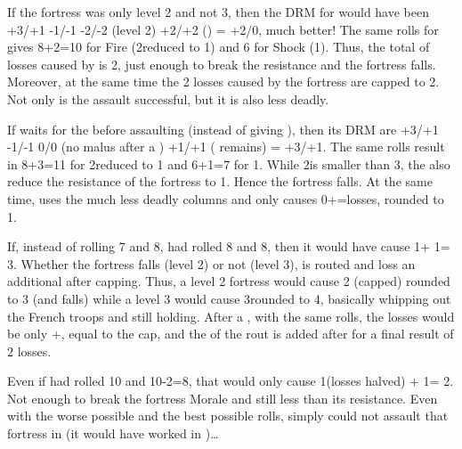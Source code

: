 \begin{exemple}
  If the fortress was only level 2 and not 3, then the DRM for \FRA would have
  been +3/+1 -1/-1 -2/-2 (level 2) +2/+2 () = +2/0,
  much better! The same rolls for \FRA gives 8+2=10 for Fire
  (2\textetoile\textetoile reduced to 1\textetoile\textetoile) and 6 for Shock
  (1). Thus, the total of losses caused by \FRA is 2, just enough to break the
  resistance and the fortress falls. Moreover, at the same time the 2\texttd
  losses caused by the fortress are capped to 2. Not only is the assault
  successful, but it is also less deadly.

  \smallskip

  If \FRA waits for the  before assaulting (instead of giving
  ), then its DRM are +3/+1 -1/-1 0/0 (no malus after a
  ) +1/+1 ( remains) = +3/+1. The same
  rolls result in 8+3=11 for 2\textetoile\textetoile reduced to 1 and 6+1=7
  for 1\texttu\textetoile. While 2\texttu is smaller than 3, the
   also reduce the resistance of the fortress to 1. Hence the
  fortress falls. At the same time, \HIS uses the much less deadly
   columns and only causes 0+\texttd=\texttd losses, rounded to
  1.

  \smallskip

  If, instead of rolling 7 and 8, \HIS had rolled 8 and 8, then it would have
  cause 1\texttu\textetoile\textetoile + 1\texttd\textetoile\textetoile =
  3\textetoile\textetoile\textetoile\textetoile. Whether the fortress falls
  (level 2) or not (level 3), \FRA is routed and loss an additional \texttd
  after capping. Thus, a level 2 fortress would cause 2 (capped) \texttd
  rounded to 3 (and falls) while a level 3 would cause 3\texttd rounded to 4,
  basically whipping out the French troops and still holding. After a
  , with the same rolls, the losses would be only
  \texttu+, equal to the cap, and the \texttd of the rout is added
  after for a final result of 2 losses.

  \smallskip

  Even if \FRA had rolled 10 and 10-2=8, that would only cause
  1\textetoile\textetoile (losses halved) + 1\texttd\textetoile =
  2\texttd\textetoile\textetoile\textetoile. Not enough to break the fortress
  Morale and still less than its resistance. Even with the worse possible \HIS
  \LeaderG and the best possible rolls, \FRA simply could not assault that
  fortress in \TARQ (it would have worked in \TMUS)\ldots
\end{exemple}

